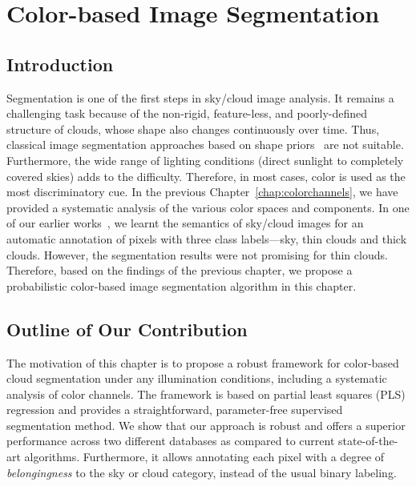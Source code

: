 \chapter{Color-based Image Segmentation}
\label{chap:segmentation}
\setlength{\fboxsep}{0pt}
\setlength{\fboxrule}{0.2pt}

 

\section{Introduction}

Segmentation is one of the first steps in sky/cloud image analysis. It remains a challenging task because of the non-rigid, feature-less, and poorly-defined structure of clouds, whose shape also changes continuously over time. Thus, classical image segmentation approaches based on shape priors~\cite{wrapper_Jain} are not suitable. Furthermore, the wide range of lighting conditions (direct sunlight to completely covered skies) adds to the difficulty. Therefore, in most cases, color is used as the most discriminatory cue. In the previous Chapter~\ref{chap:colorchannels}, we have provided a systematic analysis of the various color spaces and components. 
In one of our earlier works~\cite{ICIP2015a}, we learnt the semantics of sky/cloud images for an automatic annotation of pixels with three class labels---sky, thin clouds and thick clouds. However, the segmentation results were not promising for thin clouds. Therefore, based on the findings of the previous chapter, we propose a probabilistic color-based image segmentation algorithm in this chapter.



\section{Outline of Our Contribution}
The motivation of this chapter is to propose a robust framework for color-based cloud segmentation under any illumination conditions, including a systematic analysis of color channels. The framework is based on partial least squares (PLS) regression and provides a straightforward, parameter-free supervised segmentation method. We show that our approach is robust and offers a superior performance across two different databases as compared to current state-of-the-art algorithms. Furthermore, it allows annotating each pixel with a degree of \emph{belongingness} to the sky or cloud category, instead of the usual binary labeling.

